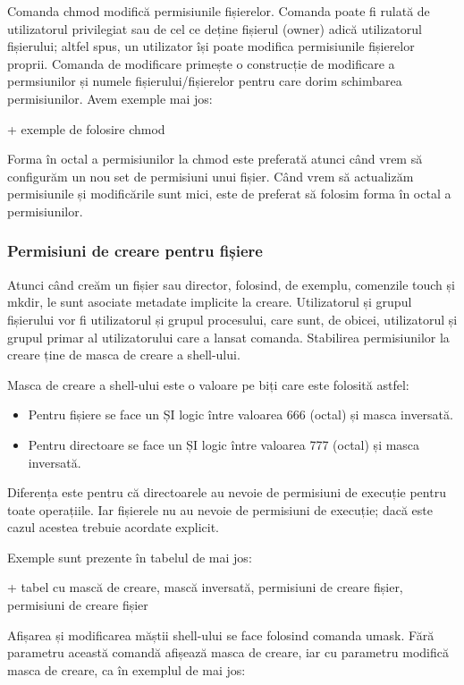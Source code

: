 Comanda chmod modifică permisiunile fișierelor. Comanda poate fi rulată de
utilizatorul privilegiat sau de cel ce deține fișierul (owner) adică
utilizatorul fișierului; altfel spus, un utilizator își poate modifica
permisiunile fișierelor proprii. Comanda de modificare primește o construcție de
modificare a permsiunilor și numele fișierului/fișierelor pentru care dorim
schimbarea permisiunilor. Avem exemple mai jos:

+ exemple de folosire chmod

Forma în octal a permisiunilor la chmod este preferată atunci când vrem să
configurăm un nou set de permisiuni unui fișier. Când vrem să actualizăm
permisiunile și modificările sunt mici, este de preferat să folosim forma în
octal a permisiunilor.

\subsubsection{Permisiuni de creare pentru fișiere}
\label{sec:users-fs-perms-umask}

Atunci când creăm un fișier sau director, folosind, de exemplu, comenzile touch
și mkdir, le sunt asociate metadate implicite la creare. Utilizatorul și grupul
fișierului vor fi utilizatorul și grupul procesului, care sunt, de obicei,
utilizatorul și grupul primar al utilizatorului care a lansat comanda.
Stabilirea permisiunilor la creare ține de masca de creare a shell-ului.

Masca de creare a shell-ului este o valoare pe biți care este folosită astfel:

\begin{itemize}
	\item Pentru fișiere se face un ȘI logic între valoarea 666 (octal) și
		masca inversată.
	\item Pentru directoare se face un ȘI logic între valoarea 777 (octal)
		și masca inversată.
\end{itemize}

Diferența este pentru că directoarele au nevoie de permisiuni de execuție pentru
toate operațiile. Iar fișierele nu au nevoie de permisiuni de execuție; dacă
este cazul acestea trebuie acordate explicit.

Exemple sunt prezente în tabelul de mai jos:

+ tabel cu mască de creare, mască inversată, permisiuni de creare fișier, permisiuni de creare fișier

Afișarea și modificarea măștii shell-ului se face folosind comanda umask. Fără
parametru această comandă afișează masca de creare, iar cu parametru modifică
masca de creare, ca în exemplul de mai jos:

